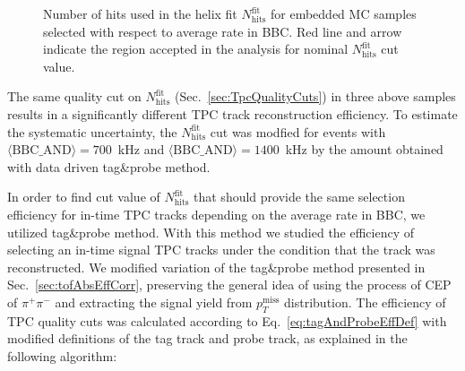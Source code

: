 \begin{figure}[H]
\begin{minipage}{.4725\textwidth}
		\caption[$\chi^{2}/\text{NDF}$ obtained in the search for the best $N_{\text{hits}}^{\text{fit}}$ cut value.]
		{Number of hits used in the helix fit $N_{\text{hits}}^{\text{fit}}$ for embedded MC samples  selected with respect to average rate in BBC. Red line and arrow indicate the region accepted in the analysis for nominal $N_{\text{hits}}^{\text{fit}}$ cut value.}\label{fig:NhitsFitPileUp}%
	\end{minipage}%
\end{figure}\vspace{-10pt}%

The same quality cut on $N_{\text{hits}}^{\text{fit}}$ (Sec.~\ref{sec:TpcQualityCuts}) in three above samples results in a significantly different TPC track reconstruction efficiency. To estimate the systematic uncertainty, the $N_{\text{hits}}^{\text{fit}}$ cut was modfied for events with \mbox{$\langle\text{BBC\_AND}\rangle=700$~kHz} and \mbox{$\langle\text{BBC\_AND}\rangle=1400$~kHz} by the amount obtained with data driven tag\&probe method.


In order to find cut value of $N_{\text{hits}}^{\text{fit}}$ that should provide the same selection efficiency for in-time TPC tracks depending on the average rate in BBC, we utilized tag\&probe method. With this method we studied the efficiency of selecting an in-time signal TPC tracks under the condition that the track was reconstructed. We modified variation of the tag\&probe method presented in Sec.~\ref{sec:tofAbsEffCorr}, preserving the general idea of using the process of CEP of $\pi^{+}\pi^{-}$ and extracting the signal yield from $p_{T}^{\text{miss}}$ distribution. The efficiency of TPC quality cuts was calculated according to Eq.~\eqref{eq:tagAndProbeEffDef} with modified definitions of the tag track and probe track, as explained in the following algorithm:

